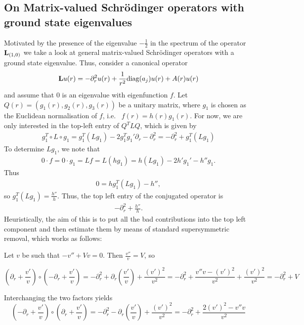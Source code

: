 \documentclass[11pt,reqno]{amsart}
\theoremstyle{remark}
\newcommand{\Lf}{\textup{\textbf{L}}}
\theoremstyle{definition}
\begin{document}
\subsection{On Matrix-valued Schrödinger operators with ground state eigenvalues}
Motivated by the presence of the eigenvalue $-\frac12$ in the spectrum of the operator $\Lf_{(1,0)}$ we take a look at general matrix-valued Schrödinger operators with a ground state eigenvalue. Thus, consider a canonical operator 
\begin{align*}
\Lf u(r)= -\partial_r^2 u(r)+\frac{1}{r^2}\text{diag}(a_j)u(r) +A(r) u(r)
\end{align*}
and assume that $0$ is an eigenvalue with eigenfunction $f$.
Let $Q(r) = (g_1(r),g_2(r),g_3(r))$ be a unitary matrix, where $g_1$ is chosen as the Euclidean normalisation of $f$, i.e.~ $f(r)= h(r) g_1(r)$.
For now, we are only interested in the top-left entry of $Q^T L Q$, which is given by
\begin{align*}
    g_1^T \circ L \circ g_1 = g_1^T (L g_1) - 2 g_1^T g_1' \partial_r - \partial_r^2 = - \partial_r^2 + g_1^T (L g_1)
\end{align*}
To determine $Lg_1$, we note that 
\begin{align*}
	0\cdot f =0\cdot g_1 = L f = L (h g_1) = h (L g_1) - 2 h' g_1 ' - h'' g_1.
\end{align*}
Thus 
\begin{align*}
	0= h g_1^T (L g_1) - h'',
\end{align*}
so $g_1^T (L g_1) = \frac{h''}{h}$. Thus, the top left entry of the conjugated operator is
\begin{align*}
	- \partial_r^2 + \frac{h''}{h}.
\end{align*}
Heuristically, the aim of this is to put all the bad contributions into the top left component and then estimate them by means of standard supersymmetric removal, which works as follows:

Let $v$ be such that $-v'' + V v = 0$. Then $\frac{v''}{v} = V$, so 

\[(\partial_r + \frac{v'}{v})\circ(-\partial_r + \frac{v'}{v}) =
- \partial_r^2 + \partial_r(\frac{v'}{v}) + \frac{(v')^2}{v^2} =
- \partial_r^2 + \frac{v'' v - (v')^2}{v^2} + \frac{(v')^2}{v^2} =
- \partial_r^2 + V \]

Interchanging the two factors yields
\[(- \partial_r + \frac{v'}{v}) \circ 	(\partial_r + \frac{v'}{v}) =
-\partial_r^2 - \partial_r(\frac{v'}{v}) + \frac{(v')^2}{v^2} =
-\partial_r^2 + \frac{2(v')^2 - v'' v}{v^2}\]
\end{document}

